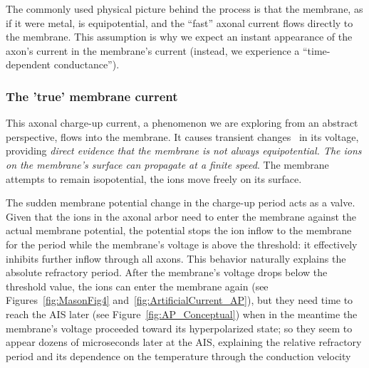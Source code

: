 The commonly used physical picture behind the process is that the
membrane, as if it were metal, is equipotential, %
and the ``fast'' axonal current flows directly to the membrane.
This assumption is why we expect an instant appearance of the axon's current
in the membrane's current (instead, we experience a ``time-dependent
conductance'').



\subsubsection{The 'true' membrane current \label{sec:Single-TrueMembranCurrent}}

This axonal charge-up current, a phenomenon we are exploring from
an abstract perspective, flows into the membrane.
It causes transient changes~\cite{TransientResponses:2008,KochElectricalPropertiesSpike:1983} in its voltage, providing \textit{direct evidence that the membrane is not always equipotential. The ions on the membrane’s surface can propagate at a finite speed}.
The membrane attempts
to remain isopotential, the ions move freely on its surface. 


The sudden membrane potential change in the charge-up
period acts as a valve. Given that the ions in the axonal arbor need to enter
	the membrane against the actual membrane potential, the potential stops the ion inflow to the membrane for the period while the membrane's voltage is above the threshold: it effectively inhibits further inflow through
all axons. This behavior naturally explains the absolute refractory
period. After the membrane's voltage drops below the threshold value,
the ions can enter the membrane again (see Figures~\ref{fig:MasonFig4} and~\ref{fig:ArtificialCurrent_AP}), but they need time to reach the
\gls{AIS}
	 later (see Figure~\ref{fig:AP_Conceptual}) when in the meantime the membrane's voltage proceeded toward its hyperpolarized state; so they seem to appear dozens of microseconds later at the
	 \gls{AIS},
	 explaining the relative refractory period and its dependence on the temperature
         through the conduction velocity~\cite{APTemperatureDependenceRefractory:2001}


